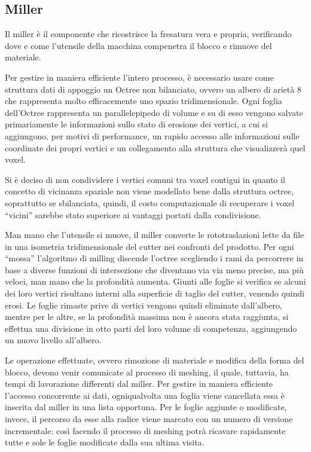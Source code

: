 \subsection{Miller}
Il miller è il componente che ricostrisce la fresatura vera e propria, verificando dove e come l'utensile della macchina compenetra il blocco e rimuove del materiale.

Per gestire in maniera efficiente l'intero processo, è necessario usare come struttura dati di appoggio un Octree non bilanciato, ovvero un albero di arietà 8 che rappresenta molto efficacemente uno spazio tridimensionale. Ogni foglia dell’Octree rappresenta un parallelepipedo di volume e su di esso vengono salvate primariamente le informazioni sullo stato di erosione dei vertici, a cui si aggiungono, per motivi di performance, un rapido accesso alle informazioni sulle coordinate dei propri vertici e un collegamento alla struttura che visualizzerà quel voxel.

Si è deciso di non condividere i vertici comuni tra voxel contigui in quanto il concetto di vicinanza spaziale non viene modellato bene dalla struttura octree, soprattutto se sbilanciata, quindi, il costo computazionale di recuperare i voxel ``vicini'' sarebbe stato superiore ai vantaggi portati dalla condivisione.

Man mano che l'utensile si muove, il miller converte le rototraslazioni lette da file in una isometria tridimensionale del cutter nei confronti del prodotto. Per ogni ``mossa'' l’algoritmo di milling discende l’octree scegliendo i rami da percorrere in base a diverse funzioni di intersezione che diventano via via meno precise, ma più veloci, man mano che la profondità aumenta. Giunti alle foglie si verifica se alcuni dei loro vertici risultano interni alla superficie di taglio del cutter, venendo quindi erosi. Le foglie rimaste prive di vertici vengono quindi eliminate dall’albero, mentre per le altre, se la profondità massima non è ancora stata raggiunta, si effettua una divisione in otto parti del loro volume di competenza, aggiungendo un nuovo livello all’albero.

Le operazione effettuate, ovvero rimozione di materiale e modifica della forma del blocco, devono venir comunicate al processo di meshing, il quale, tuttavia, ha tempi di lavorazione differenti dal miller. Per gestire in maniera efficiente l'accesso concorrente ai dati, ogniqualvolta una foglia viene cancellata essa è inserita dal miller in una lista opportuna. Per le foglie aggiunte o modificate, invece, il percorso da esse alla radice viene marcato con un numero di versione incrementale: così facendo il processo di meshing potrà ricavare rapidamente tutte e sole le foglie modificate dalla sua ultima visita.


